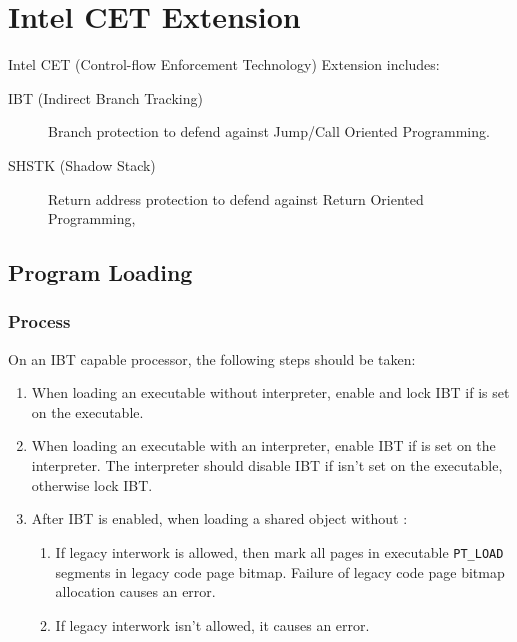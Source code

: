 \chapter{Intel CET Extension}

Intel CET (Control-flow Enforcement Technology) Extension includes:

\begin{description}
  \item[IBT (Indirect Branch Tracking)] Branch protection to defend
    against Jump/Call Oriented Programming.
  \item [SHSTK (Shadow Stack)] Return address protection to defend
    against Return Oriented Programming,
\end{description}

\section{Program Loading}

\subsection{Process }
\label{ibt}

On an IBT capable processor, the following steps should be taken:

\begin{enumerate}
  \item
    \begin{sloppypar}
      When loading an executable without interpreter, enable and lock
      IBT if  is set on the
      executable.
    \end{sloppypar}
  \item
    \begin{sloppypar}
      When loading an executable with an interpreter, enable IBT if
       is set on the interpreter.
      The interpreter should disable IBT if
       isn't set on the executable,
      otherwise lock IBT.
    \end{sloppypar}
  \item
    \begin{sloppypar}
      After IBT is enabled, when loading a shared object without
      :
   \end{sloppypar}
   \begin{enumerate}
    \item If legacy interwork is allowed, then mark all pages in
      executable \texttt{PT_LOAD} segments in legacy code page bitmap.
      Failure of legacy code page bitmap allocation causes an error.
    \item If legacy interwork isn't allowed, it causes an error.
   \end{enumerate}
\end{enumerate}

